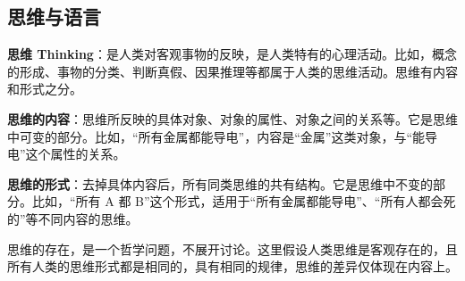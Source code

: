 \subsection{思维与语言}
\label{subsection:thinking_and_language}

\textbf{思维 Thinking}：是人类对客观事物的反映，是人类特有的心理活动。比如，概念的形成、事物的分类、判断真假、因果推理等都属于人类的思维活动。思维有内容和形式之分。

\vspace{1em}
\textbf{思维的内容}：思维所反映的具体对象、对象的属性、对象之间的关系等。它是思维中可变的部分。比如，“所有金属都能导电”，内容是“金属”这类对象，与“能导电”这个属性的关系。

\vspace{1em}
\textbf{思维的形式}：去掉具体内容后，所有同类思维的共有结构。它是思维中不变的部分。比如，“所有 A 都 B”这个形式，适用于“所有金属都能导电”、“所有人都会死的”等不同内容的思维。


\begin{remark}
    思维的存在，是一个哲学问题，不展开讨论。这里假设人类思维是客观存在的，且所有人类的思维形式都是相同的，具有相同的规律，思维的差异仅体现在内容上。
\end{remark}

